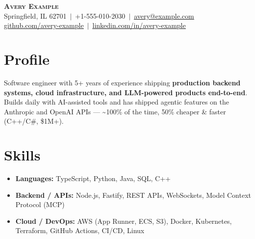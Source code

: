 \documentclass[a4paper,11pt]{article}
\newcommand{\resumeItem}[1]{
    \item\small{
        #1
        \vspace{-1pt}
    }
}
\newcommand{\resumeSubHeadingListStart}{
    \begin{itemize}[leftmargin=0in, label={}]
}
\newcommand{\resumeSubHeadingListEnd}{
    \end{itemize}
}
\begin{document}
\begin{center}
    \textbf{\LARGE \scshape Avery Example} \\ \vspace{3pt}
    \small Springfield, IL 62701 \,$|$\, +1-555-010-2030 \,$|$\, \href{mailto:avery@example.com}{\underline{avery@example.com}} \\ \vspace{1pt}
    \href{https://github.com/avery-example}{\underline{github.com/avery-example}} \,$|$\, \href{https://linkedin.com/in/avery-example}{\underline{linkedin.com/in/avery-example}}
\end{center}

\vspace{-7pt}

\section{Profile}

\small{
Software engineer with 5+ years of experience shipping \textbf{production backend systems, cloud infrastructure, and LLM-powered products end-to-end}. Builds daily with AI-assisted tools and has shipped agentic features on the Anthropic and OpenAI APIs --- \textasciitilde{}100\% of the time, 50\% cheaper \& faster (C++/C\#, \$1M+).
}

\vspace{1pt}

\section{Skills}

\resumeSubHeadingListStart

\resumeItem{\textbf{Languages:} TypeScript, Python, Java, SQL, C++}

\resumeItem{\textbf{Backend / APIs:} Node.js, Fastify, REST APIs, WebSockets, Model Context Protocol (MCP)}

\resumeItem{\textbf{Cloud / DevOps:} AWS (App Runner, ECS, S3), Docker, Kubernetes, Terraform, GitHub Actions, CI/CD, Linux}

\resumeSubHeadingListEnd
\end{document}
